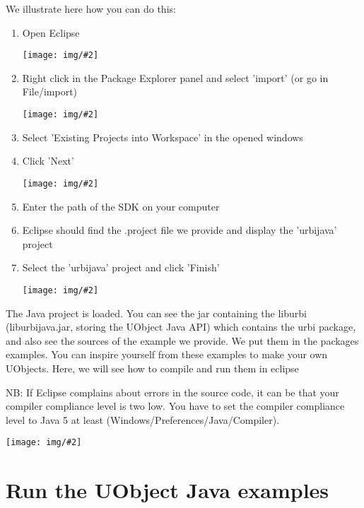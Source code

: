 \newcommand{\snapshot}[2][.6]{
  \begin{center}
    \texttt{[image: img/\#2]}
  \end{center}
}

We illustrate here how you can do this:

\begin{enumerate}
\item Open Eclipse

  \snapshot[.8]{eclipse-import}

\item Right click in the Package Explorer panel and select 'import' (or go
  in File/import)

  \snapshot{select-import}

\item Select 'Existing Projects into Workspace' in the opened windows
\item Click 'Next'

  \snapshot{select-proj}

\item Enter the path of the \urbi SDK on your computer
\item Eclipse should find the .project file we provide and display the
  'urbijava' project
\item Select the 'urbijava' project and click 'Finish'

  \snapshot[.8]{project-uobject-open}

\end{enumerate}

The Java project is loaded. You can see the jar containing the liburbi
(liburbijava.jar, storing the UObject Java API) which contains the urbi
package, and also see the sources of the example we provide. We put them in
the packages examples.  You can inspire yourself from these examples to make
your own UObjects.  Here, we will see how to compile and run them in eclipse

NB: If Eclipse complains about errors in the source code, it can be that
your compiler compliance level is two low. You have to set the compiler
compliance level to Java 5 at least (Windows/Preferences/Java/Compiler).

\snapshot[.8]{compiler-compliance-level}


\section{Run the UObject Java examples}



